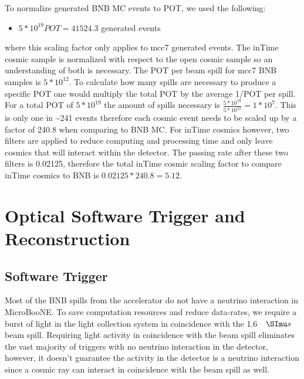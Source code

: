 To normalize generated BNB MC events to POT, we used the following:
\begin{itemize}
\item{ $5 * 10^{19} POT = 41524.3$ generated events}
\end{itemize}
where this scaling factor only applies to mcc7 generated events. The inTime cosmic sample is normalized with respect to the open cosmic sample so an understanding of both is necessary. The POT per beam spill for mcc7 BNB samples is $5 * 10^{12}$. To calculate how many spills are necessary to produce a specific POT one would multiply the total POT by the average 1/POT per spill. For a total POT of $5 * 10^{19}$ the amount of spills necessary is $\frac{5 * 10^{19}}{5 * 10^{12}} = 1 * 10^7$. This is only one in \sim 241 events therefore each cosmic event needs to be scaled up by a factor of 240.8 when comparing to BNB MC. For inTime cosmics however, two filters are applied to reduce computing and processing time and only leave cosmics that will interact within the detector. The passing rate after these two filters is 0.02125, therefore the total inTime cosmic scaling factor to compare inTime cosmics to BNB is $0.02125 * 240.8 = 5.12$.

\section{Optical Software Trigger and Reconstruction}
\subsection{Software Trigger}
Most of the BNB spills from the accelerator do not have a neutrino interaction in MicroBooNE. To save computation resources and reduce data-rates, we require a burst of light in the light collection system in coincidence with the 1.6 $\micro s $ beam spill. Requiring light activity in coincidence with the beam spill eliminates the vast majority of triggers with no neutrino interaction in the detector, however, it doesn't guarantee the activity in the detector is a neutrino interaction since a cosmic ray can interact in coincidence with the beam spill as well.

